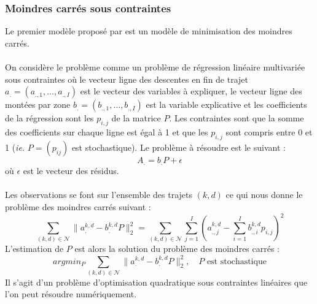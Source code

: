 \documentclass[12pt]{article}
\begin{document}
\subsubsection{Moindres carrés sous contraintes}
Le premier modèle proposé par \cite{these_remi_coulaud} est un modèle de minimisation des moindres carrés.\\
\\
On considère le problème comme un problème de régression linéaire multivariée sous contraintes où le vecteur ligne des descentes en fin de trajet $a_. = (a_{.,1}, \dots, a_{.,I})$ est le vecteur des variables à expliquer, le vecteur ligne des montées par zone $b_. =(b_{.,1}, \dots, b_{.,I})$ est la variable explicative et les coefficients de la régression sont les $p_{i,j}$ de la matrice $P$. Les contraintes sont que la somme des coefficients sur chaque ligne est égal à 1 et que les $p_{i,j}$ sont compris entre 0 et 1 (\textit{ie.} $P = (p_{ij})$ est stochastique). Le problème à résoudre est le suivant :\[
A_. = b_.P + \epsilon
\]
où $\epsilon$ est le vecteur des résidus.\\
\\
Les observations se font sur l'ensemble des trajets $(k,d)$ ce qui nous donne le problème des moindres carrés suivant :\[
\sum_{(k,d) \in \mathcal{N}} \lVert a_.^{k,d} - b_.^{k,d}P\lVert^2_2 = \sum_{(k,d) \in \mathcal{N}} \sum_{j=1}^I(a_{.,j}^{k,d}-\sum^I_{i=1}b^{k,d}_{.,i}p_{i,j})^2
\]
L'estimation de $P$ est alors la solution du problème des moindres carrés :
\[
argmin_P \sum_{(k,d) \in \mathcal{N}} \lVert a_.^{k,d} - b_.^{k,d}P\lVert^2_2, \quad P \text{ est stochastique}
\]
Il s'agit d'un problème d'optimisation quadratique sous contraintes linéaires que l'on peut résoudre numériquement. 
\end{document}
